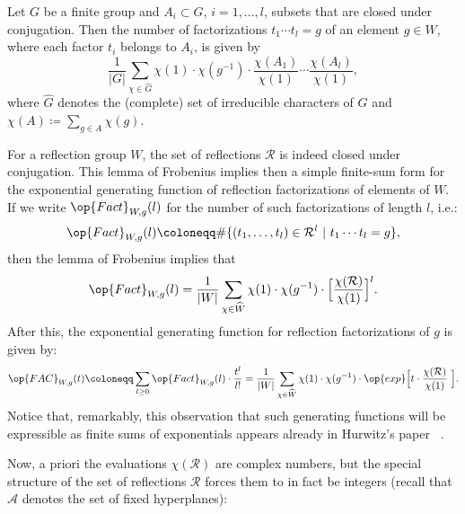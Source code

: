 \begin{theo}\label{Thm: Frobenius lemma}
Let $G$ be a finite group and $A_i\subset G$, $i=1,\ldots, l$, subsets that are closed under conjugation. Then the number of factorizations $t_1\cdots t_l=g$ of an element $g\in W$, where each factor $t_i$ belongs to $A_i$, is given by$$
\dfrac{1}{|G|}\sum_{\chi\in \widehat{G}}\chi(1)\cdot\chi(g^{-1})\cdot\dfrac{\chi(A_1)}{\chi(1)}\cdots\dfrac{\chi(A_l)}{\chi(1)},$$ where $\widehat{G}$ denotes the (complete) set of irreducible characters of $G$ and $\chi(A)\coloneqq \sum_{g\in A}\chi(g)$.  
\end{theo}

For a reflection group $W$, the set of reflections $\mathcal{R}$ is indeed closed under conjugation. This lemma of Frobenius implies then a simple finite-sum form for the exponential generating function of reflection factorizations of elements of $W$. If we write $\op{Fact}_{W,g}(l)$ for the number of such factorizations of length $l$, i.e.:$$
\op{Fact}_{W,g}(l)\coloneqq \#\{(t_1,\ldots,t_l)\in\mathcal{R}^l\ |\ t_1\cdots t_l=g\},$$ then the lemma of Frobenius implies that $$
\op{Fact}_{W,g}(l)=\dfrac{1}{|W|}\sum_{\chi\in\widehat{W}}\chi(1)\cdot\chi(g^{-1})\cdot \Big[\frac{\chi(\mathcal{R})}{\chi(1)}\Big]^l.$$ After this, the exponential generating function for reflection factorizations of $g$ is given by:\begin{equation}
\op{FAC}_{W,g}(t)\coloneqq \sum_{l\geq 0}\op{Fact}_{W,g}(l)\cdot\frac{t^l}{l!}=\dfrac{1}{|W|}\sum_{\chi\in\widehat{W}}\chi(1)\cdot\chi(g^{-1})\cdot \op{exp}\Big[t\cdot\frac{\chi(\mathcal{R})}{\chi(1)}\ \Big].\label{Eq: Frob formula no Cox} \end{equation}Notice that, remarkably, this observation that such generating functions will be expressible as finite sums of exponentials appears already in Hurwitz's paper ~\cite[\S\,3:(15)]{hurwitz-1901-paper}.

Now, a priori the evaluations $\chi(\mathcal{R})$ are complex numbers, but the special structure of the set of reflections $\mathcal{R}$ forces them to in fact be integers (recall that $\mathcal{A}$ denotes the set of fixed  hyperplanes):

